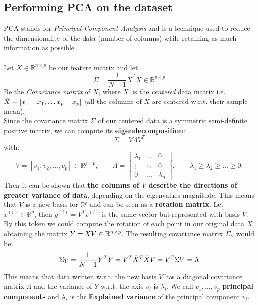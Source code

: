 \subsection{Performing PCA on the dataset}
PCA stands for \textit{Principal Component Analysis} and is a technique used to reduce the dimensionality of the data (number of columns) while retaining as much information as possible.
\\
\\
Let \(X \in \mathbb{R}^{n \times p}\) be our feature matrix and let
\begin{equation}
    \Sigma = \frac{1}{N- 1} \bar{X}^T\bar{X} \in \mathbb{R}^{p \times p}
\end{equation}
Be the \textit{Covariance matrix} of \(X\), where \(\Bar{X}\) is the \textit{centered} data matrix i.e. \(\Bar{X} = [x_1 - \Bar{x_1}, \dots x_p - \Bar{x_p}]\) (all the columns of \(X\) are centered w.r.t. their sample mean). \\
Since the covariance matrix \(\Sigma\) of our centered data is a symmetric semi-definite positive matrix, we can compute its \textbf{eigendecomposition}:
\begin{equation}
    \Sigma = V \Lambda V^T
\end{equation}
with:
\begin{equation}
 V = [v_1, v_2, \dots, v_p] \in \mathbb{R}^{p \times p}, \qquad \Lambda = \begin{bmatrix}
    \lambda_1 & \dots & 0 \\
    \vdots & \ddots & 0 \\
    0 & \dots & \lambda_n
 \end{bmatrix}, \qquad \lambda_1 \geq \lambda_2 \geq \dots \geq 0.
\end{equation}
Then it can be shown that \textbf{the columns of \(V\) describe the directions of greater variance of data}, depending on the eigenvalues magnitude. This means that \(V\) is a new basis for \(\mathbb{R}^p\) and can be seen as a \textbf{rotation matrix}. Let \(x^{(i)}\in \mathbb{R}^p\), then \(y^{(i)} = V^T x^{(i)}\) is the same vector but represented with basis \(V\). By this token we could compute the rotation of each point in our original data \(X\) obtaining the matrix \(Y = \Bar{X}V\in \mathbb{R}^{n\times p}\). The resulting covariance matrix \(\Sigma_Y\) would be:
\begin{equation}
    \Sigma_Y = \frac{1}{N- 1} Y^T Y = V^T \Bar{X}^T \Bar{X} V = V^T \Sigma V = \Lambda
\end{equation}
This means that data written w.r.t. the new basis \(V\) has a diagonal covariance matrix \(\Lambda\) and the variance of \(Y\) w.r.t. the axis \(v_i\) is \(\lambda_i\). We call \(v_1, \dots , v_p\) \textbf{principal components} and \(\lambda_i\) is the \textbf{Explained variance} of the principal component \(v_i\). \\
